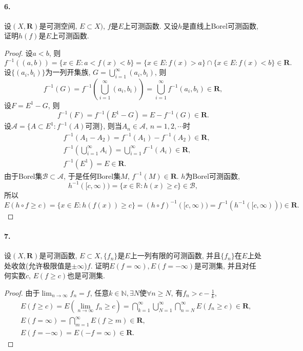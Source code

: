 \documentclass[12pt, a4paper, oneside]{ctexart}
\let\geq=\geqslant %
\def\bd{\boldsymbol}    %
\def\R{\mathbb{R}}      %
\begin{document}
\paragraph{6.}设$(X,\bd{R})$是可测空间, $E\subset X)$, $f$是$E$上可测函数. 又设$h$是直线上Borel可测函数, 证明$h(f)$是$E$上可测函数.
\begin{proof}
    设$a<b$, 则
    \begin{equation*}
        f^{-1}((a,b)) = \{x\in E:a<f(x)<b\} = \{x\in E:f(x) > a\}\cap\{x\in E:f(x) < b\}\in \bd{R}.
    \end{equation*}
    设$\{(a_i,b_i)\}$为一列开集族, $G = \bigcup_{i=1}^\infty(a_i,b_i)$, 则
    \begin{equation*}
        f^{-1}(G) = f^{-1}\left(\bigcup_{i=1}^\infty(a_i, b_i)\right) = \bigcup_{i=1}^\infty f^{-1}(a_i,b_i)\in \bd{R},
    \end{equation*}
    设$F = E^1 - G$, 则
    \begin{equation*}
        f^{-1}(F) = f^{-1}(E^1-G) = E-f^{-1}(G) \in \bd{R}.
    \end{equation*}
    设$\mathcal{A} = \{A\subset E^1:f^{-1}(A)\text{可测}\}$, 则当$A_n\in\mathcal{A}$, $n=1,2,\cdots$时
    \begin{align*}
        &\ f^{-1}(A_1-A_2)= f^{-1}(A_1)-f^{-1}(A_2)\in \bd{R},\\
        &\ f^{-1}\left(\bigcup_{i=1}^\infty A_i\right) = \bigcup_{i=1}^\infty f^{-1}(A_i)\in \bd{R},\\
        &\ f^{-1}(E^1) = E\in \bd{R}.
    \end{align*}
    由于Borel集$\mathcal{B}\subset\mathcal{A}$, 于是任何Borel集$M$, $f^{-1}(M)\in\bd{R}$.
    $h$为Borel可测函数, 
    \begin{equation*}
        h^{-1}([c,\infty)) = \{x\in \R:h(x)\geq c\}\in \mathcal{B},
    \end{equation*}
    所以
    \begin{equation*}
        E(h\circ f\geq c) = \{x\in E: h(f(x))\geq c\} = (h\circ f)^{-1}([c,\infty)) = f^{-1}(h^{-1}([c, \infty)))\in \bd{R}.
    \end{equation*}
\end{proof}
\paragraph{7.}设$(X,\bd{R})$是可测函数, $E\subset X,\{f_n\}$是$E$上一列有限的可测函数, 并且$\{f_n\}$在$E$上处处收敛(允许极限值是$\pm\infty$)$f$. 证明$E(f=\infty),E(f=-\infty)$是可测集, 并且对任何实数$c$, $E(f\geq c)$也是可测集.
\begin{proof}
    由于$\lim_{n\to\infty}f_n = f$, 任意$k\in \mathbb{N},\exists N$使$\forall n\geq N$, 有$f_n > c-\frac{1}{k}$,
    \begin{align*}
        &E(f\geq c) = E\left(\lim_{n\to\infty}f_n\geq c\right) = \bigcap_{k=1}^\infty\bigcup_{N=1}^\infty\bigcap_{n=N}^\infty E(f_n\geq c)\in \bd{R},\\
        &E(f=\infty) = \bigcap_{m=1}^\infty E(f\geq m)\in \bd{R},\\
        &E(f = -\infty) = E(-f=\infty)\in\bd{R}.
    \end{align*}
\end{proof}
\end{document}
